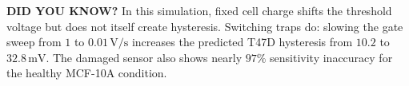 \begin{tcolorbox}[
  colback=SoftYellow,
  colframe=IEEEorange!75!black,
  boxrule=0.6pt,
  arc=0mm,
  left=3mm,right=3mm,top=2mm,bottom=2mm
]
\small
{\sffamily\bfseries\color{IEEEorange!75!black}DID YOU KNOW?}\quad
In this simulation, fixed cell charge shifts the threshold voltage but does not itself create hysteresis. Switching traps do: slowing the gate sweep from $1$ to $0.01\,\mathrm{V/s}$ increases the predicted T47D hysteresis from $10.2$ to $32.8\,\mathrm{mV}$. The damaged sensor also shows nearly $97\%$ sensitivity inaccuracy for the healthy MCF-10A condition.
\end{tcolorbox}